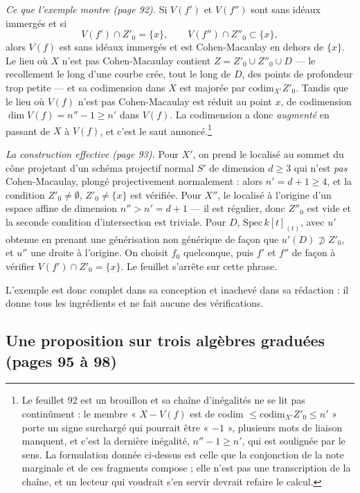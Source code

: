 \documentclass[11pt,a4paper]{article}
\begin{document}
\emph{Ce que l'exemple montre (page 92).} Si $V(f')$ et $V(f'')$ sont sans
idéaux immergés et si
\[
  V(f') \cap Z'_{0} = \{x\} , \qquad V(f'') \cap Z''_{0} \subset \{x\} ,
\]
alors $V(f)$ est sans idéaux immergés et est Cohen-Macaulay en dehors de
$\{x\}$. Le lieu où $X$ n'est pas Cohen-Macaulay contient $Z = Z'_{0} \cup
Z''_{0} \cup D$ — le recollement le long d'une courbe crée, tout le long de
$D$, des points de profondeur trop petite — et sa codimension dans $X$ est
majorée par $\mathrm{codim}_{X'} Z'_{0}$. Tandis que le lieu où $V(f)$ n'est pas
Cohen-Macaulay est réduit au point $x$, de codimension $\dim V(f) = n'' - 1
\geqslant n'$ dans $V(f)$. La codimension a donc \emph{augmenté} en passant de
$X$ à $V(f)$, et c'est le saut annoncé.\footnote{Le feuillet 92 est un brouillon
et sa chaîne d'inégalités ne se lit pas continûment : le membre « $X - V(f)$ est
de codim $\leqslant \mathrm{codim}_{X'} Z'_{0} \leqslant n'$ » porte un signe
surchargé qui pourrait être « $-1$ », plusieurs mots de liaison manquent, et
c'est la dernière inégalité, $n'' - 1 \geqslant n'$, qui est soulignée par le
sens. La formulation donnée ci-dessus est celle que la conjonction de la note
marginale et de ces fragments compose ; elle n'est pas une transcription de la
chaîne, et un lecteur qui voudrait s'en servir devrait refaire le calcul.}

\emph{La construction effective (page 93).} Pour $X'$, on prend le localisé au
sommet du cône projetant d'un schéma projectif normal $S'$ de dimension $d
\geqslant 3$ qui n'est \emph{pas} Cohen-Macaulay, plongé projectivement
normalement : alors $n' = d + 1 \geqslant 4$, et la condition $Z'_{0} \neq
\emptyset$, $Z'_{0} \neq \{x\}$ est vérifiée. Pour $X''$, le localisé à
l'origine d'un espace affine de dimension $n'' > n' = d+1$ — il est régulier,
donc $Z''_{0}$ est vide et la seconde condition d'intersection est
triviale. Pour $D$, $\mathrm{Spec}\,k[t]_{(t)}$, avec $u'$ obtenue en prenant
une générisation non générique de façon que $u'(D) \not\supset Z'_{0}$, et $u''$
une droite à l'origine. On choisit $f_{0}$ quelconque, puis $f'$ et $f''$ de
façon à vérifier $V(f') \cap Z'_{0} = \{x\}$. Le feuillet s'arrête sur cette
phrase.

L'exemple est donc complet dans sa conception et inachevé dans sa rédaction : il
donne tous les ingrédients et ne fait aucune des vérifications.

\subsection*{Une proposition sur trois algèbres graduées (pages 95 à 98)}
\end{document}
